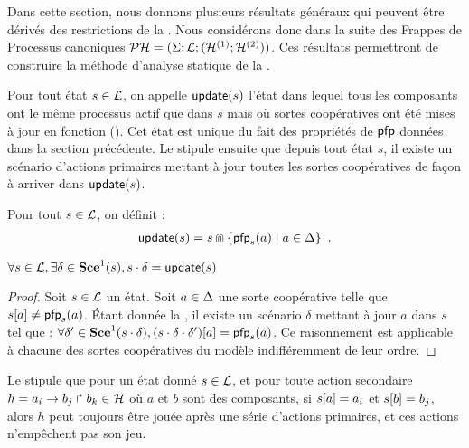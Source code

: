 Dans cette section, nous donnons plusieurs résultats généraux qui peuvent être dérivés des
restrictions de la .
Nous considérons donc dans la suite des Frappes de Processus
canoniques $\mathcal{PH} = (\Sigma; \mathcal{L}; (\mathcal{H}^{(1)}; \mathcal{H}^{(2)}))$.
Ces résultats permettront de construire la méthode d'analyse statique de la .

Pour tout état $s \in \mathcal{L}$, on appelle $\mathsf{update}(s)$ l'état dans lequel tous les composants
ont le même processus actif que dans $s$
mais où sortes coopératives ont été mises à jour en fonction ().
Cet état est unique du fait des propriétés de $\mathsf{pfp}$ données dans la section précédente.
Le  stipule ensuite que depuis tout état $s$, il existe un scénario d'actions primaires
mettant à jour toutes les sortes coopératives de façon à arriver dans $\mathsf{update}(s)$.

\begin{definition}[$\update : \PHl \rightarrow \PHl$]
  Pour tout $s \in \mathcal{L}$, on définit :
  \begin{align*}
    \mathsf{update}(s) = s \Cap \{ \mathsf{pfp}_{s}(a) \mid a \in \Delta \} \enspace.
  \end{align*}
\end{definition}

\begin{lemma}
  $\forall s \in \mathcal{L}, \exists \delta \in \mathbf{Sce}^1(s), s \cdot \delta = \mathsf{update}(s)$
\end{lemma}

\begin{proof} %
  Soit $s \in \mathcal{L}$ un état.
  Soit $a \in \Delta$ une sorte coopérative telle que ${s[a]} \neq \mathsf{pfp}_s(a)$.
  Étant donnée la , il existe un scénario $\delta$ mettant à jour $a$
  dans $s$ tel que :
  $\forall \delta' \in \mathbf{Sce}^1(s \cdot \delta),
    {(s \cdot \delta \cdot \delta')[a]} = \mathsf{pfp}_s(a)$.
  Ce raisonnement est applicable à chacune des sortes coopératives du modèle
  indifféremment de leur ordre.
\end{proof}

Le  stipule que pour un état donné $s \in \mathcal{L}$, et pour toute action secondaire
$h = a_i\rightarrow b_j\Rsh b_k \in \mathcal{H}$ où $a$ et $b$ sont des composants,
si ${s[a]} = a_i$ et ${s[b]} = b_j$, alors
$h$ peut toujours être jouée après une série d'actions primaires,
et ces actions n'empêchent pas son jeu.

